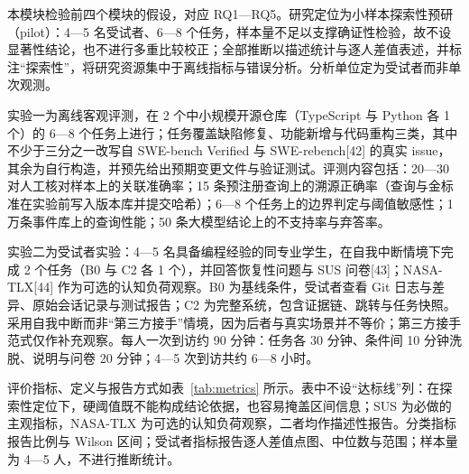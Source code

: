 
本模块检验前四个模块的假设，对应 RQ1—RQ5。研究定位为小样本探索性预研（pilot）：4—5 名受试者、6—8 个任务，样本量不足以支撑确证性检验，故不设显著性结论，也不进行多重比较校正；全部推断以描述统计与逐人差值表述，并标注“探索性”，将研究资源集中于离线指标与错误分析。分析单位定为受试者而非单次观测。

实验一为离线客观评测，在 2 个中小规模开源仓库（TypeScript 与 Python 各 1 个）的 6—8 个任务上进行；任务覆盖缺陷修复、功能新增与代码重构三类，其中不少于三分之一改写自 SWE-bench Verified 与 SWE-rebench[42] 的真实 issue，其余为自行构造，并预先给出预期变更文件与验证测试。评测内容包括：20—30 对人工核对样本上的关联准确率；15 条预注册查询上的溯源正确率（查询与金标准在实验前写入版本库并提交哈希）；6—8 个任务上的边界判定与阈值敏感性；1 万条事件库上的查询性能；50 条大模型结论上的不支持率与弃答率。

实验二为受试者实验：4—5 名具备编程经验的同专业学生，在自我中断情境下完成 2 个任务（B0 与 C2 各 1 个），并回答恢复性问题与 SUS 问卷[43]；NASA-TLX[44] 作为可选的认知负荷观察。B0 为基线条件，受试者查看 Git 日志与差异、原始会话记录与测试报告；C2 为完整系统，包含证据链、跳转与任务快照。采用自我中断而非“第三方接手”情境，因为后者与真实场景并不等价；第三方接手范式仅作补充观察。每人一次到访约 90 分钟：任务各 30 分钟、条件间 10 分钟洗脱、说明与问卷 20 分钟；4—5 次到访共约 6—8 小时。

评价指标、定义与报告方式如表~\ref{tab:metrics} 所示。表中不设“达标线”列：在探索性定位下，硬阈值既不能构成结论依据，也容易掩盖区间信息；SUS 为必做的主观指标，NASA-TLX 为可选的认知负荷观察，二者均作描述性报告。分类指标报告比例与 Wilson 区间；受试者指标报告逐人差值点图、中位数与范围；样本量为 4—5 人，不进行推断统计。

